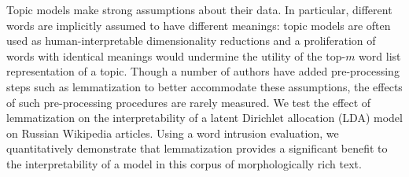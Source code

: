     Topic models make strong assumptions about their data.  In
    particular, different words are implicitly assumed to
    have different meanings: topic models are often used as
    human-interpretable dimensionality reductions and a proliferation
    of words with identical meanings would undermine the utility of the
    top-$m$ word list representation of a topic.  Though a number
    of authors have added pre-processing steps such as lemmatization to
    better accommodate these assumptions, the effects of such
    pre-processing procedures are rarely measured.  We test the
    effect of lemmatization on the interpretability of a
    latent Dirichlet allocation (LDA) model on Russian Wikipedia
    articles.  Using a word intrusion evaluation, we quantitatively
    demonstrate that lemmatization provides a significant benefit to
    the interpretability of a model in this corpus of morphologically
    rich text.
